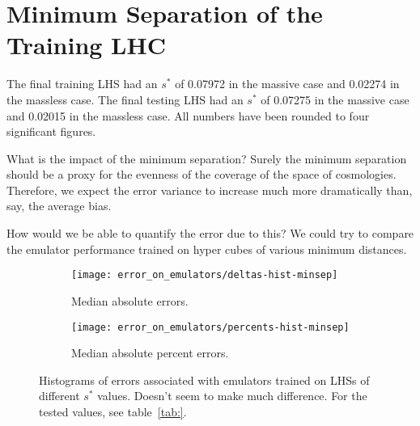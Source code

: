 \section{Minimum Separation of the Training LHC}
\label{sec: error_from_lhc}

The final training LHS had an $s^*$ of 0.07972 in the massive case and 
0.02274 in the massless case. The final testing LHS had an $s^*$ of 0.07275 in 
the massive case and 0.02015 in the massless case. All numbers have been 
rounded to four significant figures.

What is the impact of the minimum separation? Surely the minimum separation
should be a proxy for the evenness of the coverage of the space of
cosmologies. Therefore, we expect the error variance to increase much more
dramatically than, say, the average bias.

How would we be able to quantify the error due to this? We could try to 
compare the emulator performance trained on hyper cubes of various minimum 
distances.

\begin{figure}[ht!]
    \begin{subfigure}{0.35 \textheight}
    \centering
 		\texttt{[image: error\_on\_emulators/deltas-hist-minsep]}
 		\caption{Median absolute errors.}
 		\label{fig: minsep_experiment_deltas}
    \end{subfigure}
    \begin{subfigure}{0.35 \textheight}
    \centering
 		\texttt{[image: error\_on\_emulators/percents-hist-minsep]}
 		\caption{Median absolute percent errors.}
 		\label{fig: minsep_experiment_percerr}
    \end{subfigure}
        \centering
    \caption[Impact of $s^*$ on Accuracy]
    		{Histograms of errors associated with emulators trained on LHSs of
    			different $s^*$ values. Doesn't seem to make much difference. For the tested values, see
    			table~\ref{tab:}.}
    \label{fig: minsep_experiment}
\end{figure}

